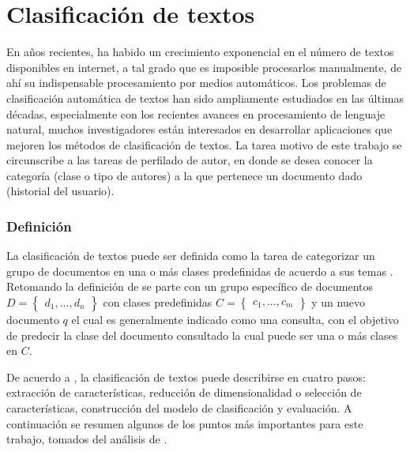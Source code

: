 \section{Clasificación de textos}

En años recientes, ha habido un crecimiento exponencial en el número de textos disponibles en internet, a tal grado que es imposible procesarlos  manualmente, de ahí su indispensable procesamiento por medios automáticos. Los problemas de clasificación automática de textos han sido ampliamente estudiados en las últimas décadas, especialmente con los recientes avances en procesamiento de lenguaje natural, muchos investigadores están interesados en desarrollar aplicaciones que mejoren los métodos de clasificación de textos. La tarea motivo de este trabajo se circunscribe a las tareas de perfilado de autor, en donde se desea conocer la categoría (clase o tipo de autores) a la que pertenece un documento dado (historial del usuario).

\subsubsection{Definición}

La clasificación de textos puede ser definida como la tarea de categorizar un grupo de documentos en una o más clases predefinidas de acuerdo a sus temas \citep{Kadhim2019}. Retomando la definición de \citep{Kadhim2019} se parte con un grupo específico de documentos  $D={\begin{Bmatrix} d_1 , ... , d_n \end{Bmatrix}}$ con clases predefinidas $C={\begin{Bmatrix} c_1 , ... , c_m \end{Bmatrix}}$ y un nuevo documento $q$ el cual es generalmente indicado como una consulta,  con el objetivo de predecir la  clase del documento consultado la cual puede ser una o más clases en $C$.

 
De acuerdo a \citep{kowsari2019text}, la clasificación de textos puede describirse en cuatro pasos: extracción de características, reducción de dimensionalidad o selección de características, construcción del modelo de clasificación y evaluación. A continuación  se resumen algunos de los puntos más importantes para este trabajo, tomados del análisis de \citep{kowsari2019text}.

